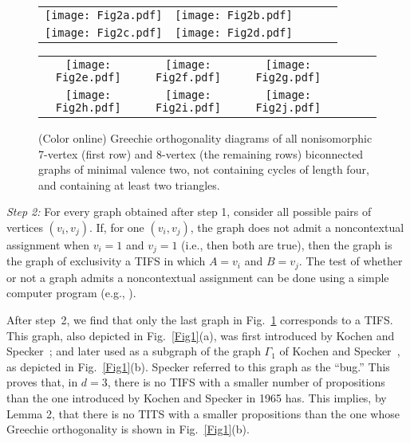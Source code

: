 \documentclass[%
 twocolumn,
 groupedaddress,
 showpacs,
 showkeys,
 preprintnumbers,
 amsmath,amssymb,
 aps,
 pra,
 longbibliography,
 floatfix,
 ]{revtex4-1}
\begin{document}
\begin{figure}
	\begin{center}
		\setlength{\tabcolsep}{1em}
		\begin{tabular}{ccccc}
			\texttt{[image: Fig2a.pdf]}
			&
			\texttt{[image: Fig2b.pdf]}
			\\ 
			\texttt{[image: Fig2c.pdf]}
			& 
			\texttt{[image: Fig2d.pdf]}
			\\
		\end{tabular}
		\begin{tabular}{cccccc}
			\texttt{[image: Fig2e.pdf]}
			&
			\texttt{[image: Fig2f.pdf]}
			&
			\texttt{[image: Fig2g.pdf]}
			\\
			\texttt{[image: Fig2h.pdf]} 
			&
			\texttt{[image: Fig2i.pdf]} 
			&
			\texttt{[image: Fig2j.pdf]} 
		\end{tabular}
	\end{center}
	\centering
	\caption{\label{Fig2}
	(Color online) Greechie orthogonality diagrams of all nonisomorphic 7-vertex (first row) and 8-vertex (the remaining rows)
		biconnected graphs of minimal valence two, not containing cycles of length four, and containing at least two triangles.}
\end{figure}


{\em Step 2:} For every graph obtained after step 1, consider all possible pairs of vertices $(v_i,v_j)$. If, for one $(v_i,v_j)$, the graph does not admit a noncontextual assignment when $v_i=1$ and $v_j=1$ (i.e., then both are true), then the graph is the graph of exclusivity a TIFS in which $A=v_i$ and $B=v_j$. The test of whether or not a graph admits a noncontextual assignment can be done using a simple computer program (e.g., \cite{Peres93}).

After step~2, we find that only the last graph in Fig.~\ref{Fig2} corresponds to a TIFS. This graph, also depicted in Fig.~\ref{Fig1}(a), was first introduced by Kochen and Specker~\cite[Fig.~1, p.~182]{KS65}; and later used as a subgraph of the graph $\Gamma_1$ of Kochen and Specker~\cite{KS67}, as depicted in Fig.~\ref{Fig1}(b). Specker referred to this graph as the ``bug.'' This proves that, in $d=3$, there is no TIFS with a smaller number of propositions than the one introduced by Kochen and Specker in 1965 has. This implies, by Lemma 2, that there is no TITS with a smaller propositions than the one whose Greechie orthogonality is shown in Fig.~\ref{Fig1}(b).
\end{document}
